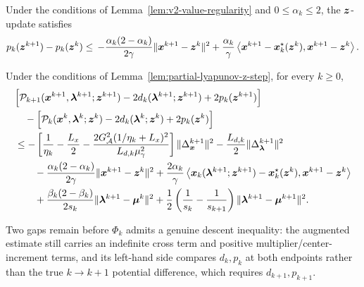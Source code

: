\begin{lemma}
\label{lem:z-step-p}
Under the conditions of Lemma~\ref{lem:v2-value-regularity} and
$0\le\alpha_k\le2$, the $\bm{z}$-update satisfies
\begin{equation}
\begin{aligned}
p_k(\bm{z}^{k+1})-p_k(\bm{z}^k)
\le\,
-\frac{\alpha_k(2-\alpha_k)}{2\gamma}
\|\bm{x}^{k+1}-\bm{z}^k\|^2 +
\frac{\alpha_k}{\gamma}
\left\langle
\bm{x}^{k+1}-\bm{x}_k^\star(\bm{z}^k),
\bm{x}^{k+1}-\bm{z}^k
\right\rangle.
\end{aligned}
\label{eq:z-step-p}
\end{equation}
\end{lemma}

\begin{lemma}
\label{lem:augmented-one-step}
Under the conditions of Lemma~\ref{lem:partial-lyapunov-z-step}, for every
$k\ge0$,
\begin{equation}
\begin{aligned}
&\Big[
\mathcal P_{k+1}(\bm{x}^{k+1},\bm{\lambda}^{k+1};\bm{z}^{k+1})
-2d_k(\bm{\lambda}^{k+1};\bm{z}^{k+1})
+2p_k(\bm{z}^{k+1})
\Big] \\
&\quad-
\Big[
\mathcal P_k(\bm{x}^k,\bm{\lambda}^k;\bm{z}^k)
-2d_k(\bm{\lambda}^k;\bm{z}^k)
+2p_k(\bm{z}^k)
\Big] \\
&\le
-\left[
\frac1{\eta_k}-\frac{L_x}{2}
-\frac{2G_{\mathcal A}^2(1/\eta_k+L_x)^2}
{L_{d,k}\mu_\gamma^2}
\right]
\|\Delta_{\bm{x}}^{k+1}\|^2
-\frac{L_{d,k}}{2}\|\Delta_{\bm{\lambda}}^{k+1}\|^2 \\
&\qquad
-\frac{\alpha_k(2-\alpha_k)}{2\gamma}
\|\bm{x}^{k+1}-\bm{z}^k\|^2
+\frac{2\alpha_k}{\gamma}
\left\langle
\bm{x}_k(\bm{\lambda}^{k+1};\bm{z}^{k+1})
-\bm{x}_k^\star(\bm{z}^k),
\bm{x}^{k+1}-\bm{z}^k
\right\rangle \\
&\qquad
+\frac{\beta_k(2-\beta_k)}{2s_k}
\|\bm{\lambda}^{k+1}-\bm{\mu}^k\|^2
+\frac12\left(\frac1{s_k}-\frac1{s_{k+1}}\right)
\|\bm{\lambda}^{k+1}-\bm{\mu}^{k+1}\|^2.
\end{aligned}
\label{eq:augmented-one-step}
\end{equation}
\end{lemma}

Two gaps remain before $\Phi_k$ admits a genuine descent inequality: the augmented estimate still carries an indefinite cross term and positive multiplier/center-increment terms, and its left-hand side compares $d_k, p_k$ at both endpoints rather than the true $k \to k+1$ potential difference, which requires $d_{k+1}, p_{k+1}$. 

